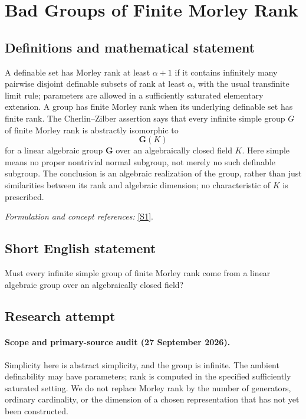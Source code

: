 \documentclass[11pt]{article}
\begin{document}
\section*{\texorpdfstring{Bad Groups of Finite Morley Rank}{Bad Groups of Finite Morley Rank}}\label{30002259}
\subsection{Definitions and mathematical statement}
A definable set has Morley rank at least $\alpha+1$ if it contains infinitely many pairwise disjoint definable subsets of rank at least $\alpha$, with the usual transfinite limit rule; parameters are allowed in a sufficiently saturated elementary extension. A group has finite Morley rank when its underlying definable set has finite rank. The Cherlin--Zilber assertion says that every infinite simple group $G$ of finite Morley rank is abstractly isomorphic to
\[
 \mathbf G(K)
\]
for a linear algebraic group $\mathbf G$ over an algebraically closed field $K$. Here simple means no proper nontrivial normal subgroup, not merely no such definable subgroup. The conclusion is an algebraic realization of the group, rather than just similarities between its rank and algebraic dimension; no characteristic of $K$ is prescribed.
\par\smallskip\textit{Formulation and concept references:} \href{https://arxiv.org/abs/2606.18207}{[S1]}.

\subsection{Short English statement}
Must every infinite simple group of finite Morley rank come from a linear algebraic group over an algebraically closed field?
\subsection{Research attempt}
\paragraph{Scope and primary-source audit (27 September 2026).}
Simplicity here is abstract simplicity, and the group is infinite. The
ambient definability may have parameters; rank is computed in the
specified sufficiently saturated setting. We do not replace Morley
rank by the number of generators, ordinary cardinality, or the dimension
of a chosen representation that has not yet been constructed.
\end{document}
